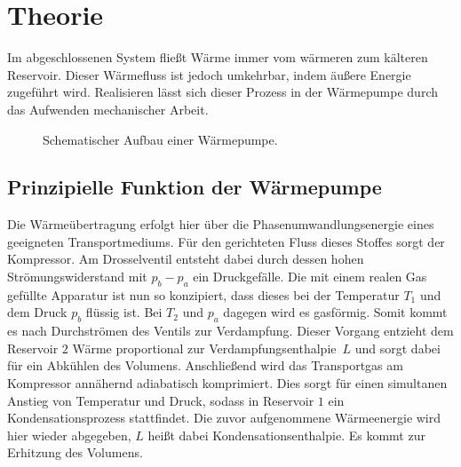 \section{Theorie}
\label{sec:theorie}

Im abgeschlossenen System fließt Wärme immer vom wärmeren zum kälteren Reservoir. Dieser Wärmefluss
ist jedoch umkehrbar, indem äußere Energie zugeführt wird. Realisieren lässt sich dieser Prozess in
der Wärmepumpe durch das Aufwenden mechanischer Arbeit.

\begin{figure}
	\centering
	\vspace{1.23ex}
	\begin{tikzpicture}
		
	\end{tikzpicture}
	\vspace{1.23ex}
	\caption{Schematischer Aufbau einer Wärmepumpe.}
	\label{fig:pumpe}
\end{figure}

\subsection{Prinzipielle Funktion der Wärmepumpe}

Die Wärmeübertragung erfolgt hier über die Phasenumwandlungsenergie eines geeigneten Transportmediums.
Für den gerichteten Fluss dieses Stoffes sorgt der Kompressor. Am Drosselventil entsteht dabei durch
dessen hohen Strömungswiderstand mit $p_b \! - p_a$ ein Druckgefälle. Die mit einem realen Gas gefüllte
Apparatur ist nun so konzipiert, dass dieses bei der Temperatur $T_1$ und dem Druck $p_b$ flüssig ist.
Bei $T_2$ und $p_a$ dagegen wird es gasförmig. Somit kommt es nach Durchströmen des Ventils zur
Verdampfung. Dieser Vorgang entzieht dem Reservoir $2$ Wärme proportional zur \mbox{Verdampfungsenthalpie
$L$} und sorgt dabei für ein Abkühlen des Volumens. Anschließend wird das Transportgas am Kompressor
annähernd adiabatisch komprimiert. Dies sorgt für einen simultanen Anstieg von Temperatur und Druck,
sodass in Reservoir $1$ ein Kondensationsprozess stattfindet. Die zuvor aufgenommene Wärmeenergie wird
hier wieder abgegeben, $L$ heißt dabei Kondensationsenthalpie. Es kommt zur Erhitzung des Volumens.

